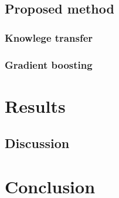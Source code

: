 \documentclass{article}
\begin{document}
\subsection{Proposed method}

\subsubsection{Knowlege transfer}

\subsubsection{Gradient boosting}



\section{Results}

\subsection{Discussion}

\section{Conclusion}

\footnotesize{
\begin{spacing}{.85 }


\end{spacing}
}
\end{document}
